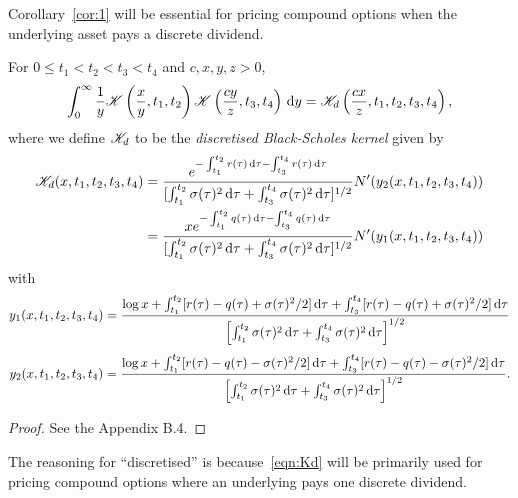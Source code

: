 Corollary~\ref{cor:1} will be essential for pricing compound options when the underlying asset pays a discrete dividend.
	\begin{lemma}
		\label{lem:kd}
		For $0 \leq t_1 < t_2 < t_3 < t_4$ and $c,x,y,z > 0$,
		\begin{equation}
			\label{eqn:intlem1}
			\int_0^\infty \frac{1}{y}\mathscr K\left( \frac{x}{y}, t_1, t_2 \right)\mathscr K\left( \frac{cy}{z}, t_3, t_4 \right) \, \mathrm d y = \mathscr K_d\left( \frac{cx}{z}, t_1, t_2, t_3, t_4 \right),
		\end{equation}
where we define $\mathscr K_d$ to be the \emph{discretised Black-Scholes kernel} given by
	\begin{equation}
		\label{eqn:Kd}
		\begin{split}
		\mathscr K_d(x,t_1,t_2,t_3,t_4) &=  \frac{e^{-\int_{t_1}^{t_2} r(\tau) \, \mathrm d\tau - \int_{t_3}^{t_4} r(\tau) \, \mathrm d\tau}}{[\int_{t_1}^{t_2} \sigma(\tau)^2 \, \mathrm d\tau + \int_{t_3}^{t_4} \sigma(\tau)^2 \, \mathrm d\tau]^{1/2}}N'(y_2(x,t_1,t_2,t_3,t_4))
\\
		& =  \frac{xe^{-\int_{t_1}^{t_2} q(\tau) \, \mathrm d\tau - \int_{t_3}^{t_4} q(\tau) \, \mathrm d\tau}}{[\int_{t_1}^{t_2} \sigma(\tau)^2 \, \mathrm d\tau + \int_{t_3}^{t_4} \sigma(\tau)^2 \, \mathrm d\tau]^{1/2}}N'(y_1(x,t_1,t_2,t_3,t_4))
		\end{split}
	\end{equation}
with
	\begin{equation}
		\label{eqn:y1}
		y_1(x,t_1,t_2,t_3,t_4) = \frac{\log x + \int_{t_1}^{t_2} [r(\tau) - q(\tau) + \sigma(\tau)^2/2] \, \mathrm d\tau + \int_{t_3}^{t_4} [r(\tau) - q(\tau) + \sigma(\tau)^2/2] \, \mathrm d\tau}{\left[\int_{t_1}^{t_2} \sigma(\tau)^2 \, \mathrm d\tau + \int_{t_3}^{t_4} \sigma(\tau)^2 \, \mathrm d\tau\right]^{1/2}}
	\end{equation}
	\begin{equation}
		\label{eqn:y2}
		y_2(x,t_1,t_2,t_3,t_4) = \frac{\log x + \int_{t_1}^{t_2} [r(\tau) - q(\tau) - \sigma(\tau)^2/2] \, \mathrm d\tau + \int_{t_3}^{t_4} [r(\tau) - q(\tau) - \sigma(\tau)^2/2] \, \mathrm d\tau}{\left[\int_{t_1}^{t_2} \sigma(\tau)^2 \, \mathrm d\tau + \int_{t_3}^{t_4} \sigma(\tau)^2 \, \mathrm d\tau\right]^{1/2}}.
	\end{equation}
	\end{lemma}
\begin{proof}
	See the Appendix B.4.
\end{proof}
The reasoning for ``discretised'' is because~\eqref{eqn:Kd} will be primarily used for pricing compound options where an underlying pays one discrete dividend.
